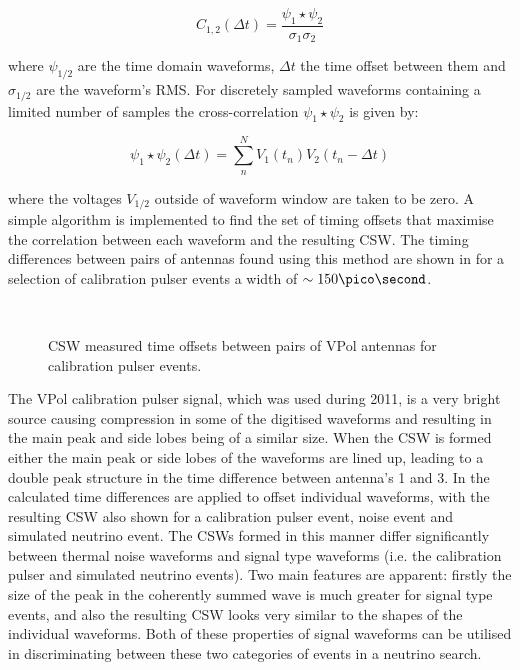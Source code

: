 \begin{equation}
  C_{1,2}(\Delta t) = \frac{\psi_{1} \star \psi_{2}}{\sigma_{1} \sigma_{2}}
  \label{eq:analysis:Reconstruction:Normalised-Cross-Correlation}
\end{equation}

\noindent where $\psi_{1/2}$ are the time domain waveforms, $\Delta t$ the time offset between them and $\sigma_{1/2}$ are the waveform's RMS. For discretely sampled waveforms containing a limited number of samples the cross-correlation $\psi_{1} \star \psi_{2}$ is given by:

\begin{equation}
  \psi_{1} \star \psi_{2} (\Delta t) = \sum_{n}^{N} V_{1}(t_{n}) V_{2}(t_{n}-\Delta t)
  \label{eq:analysis:Reconstruction:Discrete-Cross-Correlation}
\end{equation}

\noindent where the voltages $V_{1/2}$ outside of waveform window are taken to be zero. A simple algorithm is implemented to find the set of timing offsets that maximise the correlation between each waveform and the resulting CSW. The timing differences between pairs of antennas found using this method are shown in  for a selection of calibration pulser events a width of $\sim 150 \pico \second$. 

\begin{figure}[htpb]
  \hfill
  \\
  \caption{CSW measured time offsets between pairs of VPol antennas for calibration pulser events.}
  \label{fig:analysis:Reconstruction:CSW-DeltaT}
\end{figure}


The VPol calibration pulser signal, which was used during 2011, is a very bright source causing compression in some of the digitised waveforms and resulting in the main peak and side lobes being of a similar size. When the CSW is formed either the main peak or side lobes of the waveforms are lined up, leading to a double peak structure in the time difference between antenna's 1 and 3. In  the calculated time differences are applied to offset individual waveforms, with the resulting CSW also shown for a calibration pulser event, noise event and simulated neutrino event. The CSWs formed in this manner differ significantly between thermal noise waveforms and signal type waveforms (i.e. the calibration pulser and simulated neutrino events). Two main features are apparent: firstly the size of the peak in the coherently summed wave is much greater for signal type events, and also the resulting CSW looks very similar to the shapes of the individual waveforms. Both of these properties of signal waveforms can be utilised in discriminating between these two categories of events in a neutrino search.


